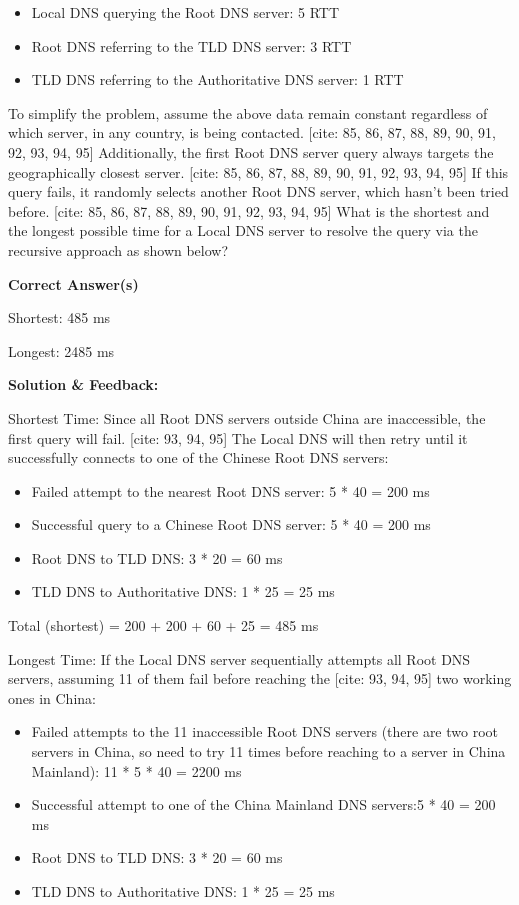 \begin{itemize}
    \item Local DNS querying the Root DNS server: 5 RTT
    \item Root DNS referring to the TLD DNS server: 3 RTT
    \item TLD DNS referring to the Authoritative DNS server: 1 RTT
\end{itemize}

To simplify the problem, assume the above data remain constant 
regardless of which server, in any country, is being contacted. [cite: 85, 86, 87, 88, 89, 90, 91, 92, 93, 94, 95] Additionally, the first Root DNS server query always targets the 
geographically closest server. [cite: 85, 86, 87, 88, 89, 90, 91, 92, 93, 94, 95] If this query fails, it randomly selects 
another Root DNS server, which hasn’t been tried before. [cite: 85, 86, 87, 88, 89, 90, 91, 92, 93, 94, 95] What is the shortest and the longest possible time for a Local DNS server 
to resolve the query via the recursive approach as shown below?

\textbf{Correct Answer(s)}

Shortest: 485 ms

Longest: 2485 ms

\textbf{Solution \& Feedback:}

Shortest Time: Since all Root DNS servers outside China are inaccessible, the first 
query will fail. [cite: 93, 94, 95] The Local DNS will then retry until it successfully connects to one of the 
Chinese Root DNS servers:

\begin{itemize}
    \item Failed attempt to the nearest Root DNS server: 5 * 40 = 200 ms
    \item Successful query to a Chinese Root DNS server: 5 * 40 = 200 ms
    \item Root DNS to TLD DNS: 3 * 20 = 60 ms
    \item TLD DNS to Authoritative DNS: 1 * 25 = 25 ms
\end{itemize}

Total (shortest) = 200 + 200 + 60 + 25 = 485 ms

Longest Time: If the Local DNS server sequentially attempts all Root DNS servers, 
assuming 11 of them fail before reaching the
[cite: 93, 94, 95] two working ones in China:

\begin{itemize}
    \item Failed attempts to the 11 inaccessible Root DNS servers (there are two root 
servers in China, so need to try 11 times before reaching to a server in China 
Mainland): 11 * 5 * 40 = 2200 ms
    \item Successful attempt to one of the China Mainland DNS servers:5 * 40 = 200 ms
    \item Root DNS to TLD DNS: 3 * 20 = 60 ms
    \item TLD DNS to Authoritative DNS: 1 * 25 = 25 ms
\end{itemize}

